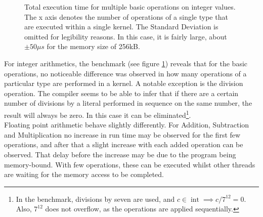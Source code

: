 \begin{figure}[h]
	\begin{center}
		\caption{Total execution time for multiple basic operations on integer values. The x axis denotes the number of operations of a single type that are executed within a single kernel. The Standard Deviation is omitted for legibility reasons. In this case, it is fairly large, about $\pm50\mu s$ for the memory size of 256kB.}
		\label{fig:model_ops_multiple_int}
	\end{center}
\end{figure}

For integer arithmetics, the benchmark (see figure \ref{fig:model_ops_multiple_int}) reveals that for the basic operations, no noticeable difference was observed in how many operations of a particular type are performed in a kernel. A notable exception is the division operation. The compiler seems to be able to infer that if there are a certain number of divisions by a literal performed in sequence on the same number, the result will always be zero. In this case it can be eliminated\footnote{In the benchmark, divisions by seven are used, and $c \in \operatorname{int} \implies c / 7^{12} = 0$. Also, $7^{12}$ does not overflow, as the operations are applied sequentially.}. \\

Floating point arithmetic behave slightly differently. For Addition, Subtraction and Multiplication no increase in run time may be observed for the first few operations, and after that a slight increase with each added operation can be observed. That delay before the increase may be due to the program being memory-bound. With few operations, these can be executed whilst other threads are waiting for the memory access to be completed. \\

